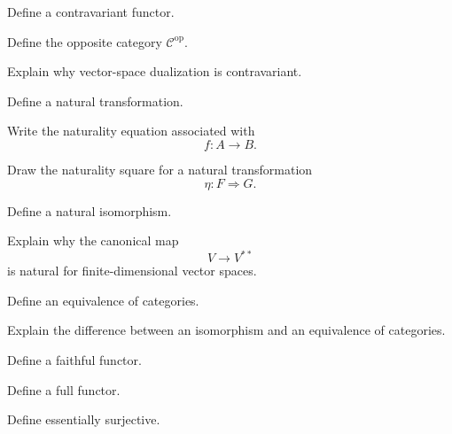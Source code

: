 \begin{exercise}[1]
Define a contravariant functor.
\end{exercise}

\begin{exercise}[1]
Define the opposite category \(\mathcal C^{\mathrm{op}}\).
\end{exercise}

\begin{exercise}[2]
Explain why vector-space dualization is contravariant.
\end{exercise}

\begin{exercise}[1]
Define a natural transformation.
\end{exercise}

\begin{exercise}[2]
Write the naturality equation associated with
\[ f:A\to B. \]
\end{exercise}

\begin{exercise}[2]
Draw the naturality square for a natural transformation
\[ \eta:F\Rightarrow G. \]
\end{exercise}

\begin{exercise}[1]
Define a natural isomorphism.
\end{exercise}

\begin{exercise}[2]
Explain why the canonical map
\[ V\to V^{**} \]
is natural for finite-dimensional vector spaces.
\end{exercise}

\begin{exercise}[1]
Define an equivalence of categories.
\end{exercise}

\begin{exercise}[2]
Explain the difference between an isomorphism and an equivalence of
categories.
\end{exercise}

\begin{exercise}[1]
Define a faithful functor.
\end{exercise}

\begin{exercise}[1]
Define a full functor.
\end{exercise}

\begin{exercise}[1]
Define essentially surjective.
\end{exercise}

